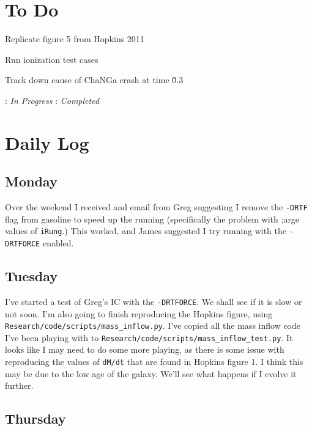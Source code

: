 \documentclass[11pt,letterpaper]{article}
\begin{document}
\section{To Do}
\begin{bullets}
\item[\checkmark] Replicate figure 5 from Hopkins 2011
\item[\checkmark] Run ionization test cases
\item Track down cause of ChaNGa crash at time \~0.3
\end{bullets}

\textleaf : \textit{In Progress} \qquad \checkmark : \textit{Completed}
\section{Daily Log}

\subsection{Monday}

Over the weekend I received and email from Greg suggesting I remove the
\texttt{-DRTF} flag from gasoline to speed up the running (specifically
the problem with ;arge values of \texttt{iRung}.) This worked, and James
suggested I try running with the \texttt{-DRTFORCE} enabled.

\subsection{Tuesday}

I've started a test of Greg's IC with the \texttt{-DRTFORCE}. We shall
see if it is slow or not soon. I'm also going to finish reproducing the
Hopkins figure, using \texttt{Research/code/scripts/mass\_inflow.py}.
I've copied all the mass inflow code I've been playing with to
\texttt{Research/code/scripts/mass\_inflow\_test.py}. It looks like I
may need to do some more playing, as there is some issue with
reproducing the values of \texttt{dM/dt} that are found in Hopkins
figure 1. I think this may be due to the low age of the galaxy. We'll
see what happens if I evolve it further.

\subsection{Thursday}
\end{document}
